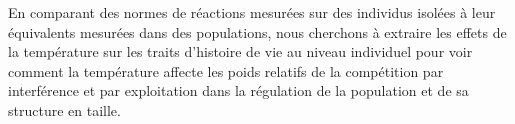 En comparant des normes de réactions mesurées sur des individus isolées à leur
équivalents mesurées dans des populations, nous cherchons à extraire les effets
de la température sur les traits d'histoire de vie au niveau individuel pour
voir comment la température affecte les poids relatifs de la compétition par
interférence et par exploitation dans la régulation de la population et de sa
structure en taille.

